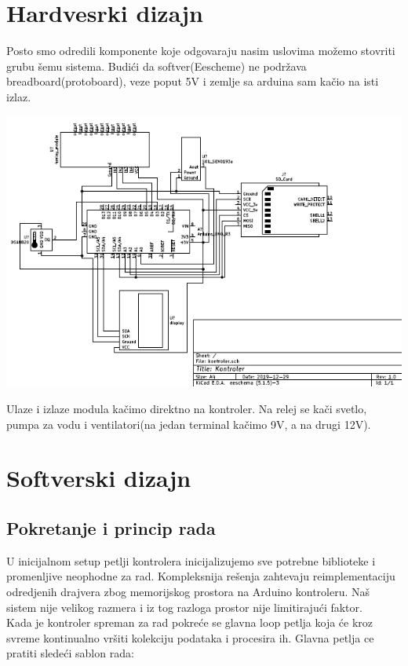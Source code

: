 \documentclass[a4paper,11pt]{book}
\begin{document}
\section{Hardvesrki dizajn}

Posto smo odredili komponente koje odgovaraju nasim uslovima možemo stovriti grubu šemu sistema. Budići da softver(Eescheme) ne podržava breadboard(protoboard), veze poput 5V i zemlje sa arduina sam kačio na isti izlaz. 

\includegraphics[width=\textwidth]{kontroler.png}

Ulaze i izlaze modula kačimo direktno na kontroler. Na relej se kači svetlo, pumpa za vodu i ventilatori(na jedan terminal kačimo 9V, a na drugi 12V).

\section{Softverski dizajn}

\subsection{Pokretanje i princip rada}

U inicijalnom setup petlji kontrolera inicijalizujemo sve potrebne biblioteke i promenljive neophodne za rad. Kompleksnija rešenja zahtevaju reimplementaciju odredjenih drajvera zbog memorijskog prostora na Arduino kontroleru. Naš sistem nije velikog razmera i iz tog razloga prostor nije limitirajući faktor.\\

Kada je kontroler spreman za rad pokreće se glavna loop petlja koja će kroz svreme kontinualno vršiti kolekciju podataka i procesira ih. Glavna petlja ce pratiti sledeći sablon rada:
\end{document}
